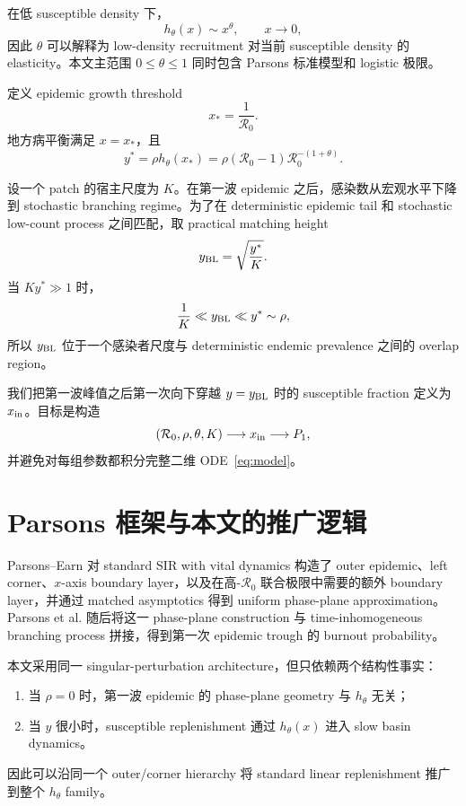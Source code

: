\documentclass[11pt,a4paper]{ctexart}
\newcommand{\Rzero}{\mathcal R_0}
\newcommand{\BL}{y_{\rm BL}}
\newcommand{\xin}{x_{\rm in}}
\newcommand{\xs}{x_*}
\newcommand{\Pone}{P_1}
\begin{document}
在低 susceptible density 下，
\[
h_\theta(x)\sim x^\theta,
\qquad x\to0,
\]
因此 $\theta$ 可以解释为 low-density recruitment 对当前 susceptible density 的 elasticity。本文主范围 $0\leq\theta\leq1$ 同时包含 Parsons 标准模型和 logistic 极限。

定义 epidemic growth threshold
\begin{equation}
\label{eq:xstar}
\xs=\frac1{\Rzero}.
\end{equation}
地方病平衡满足 $x=\xs$，且
\begin{equation}
\label{eq:ystar}
y^*=\rho h_\theta(\xs)
=\rho(\Rzero-1)\Rzero^{-(1+\theta)}.
\end{equation}

设一个 patch 的宿主尺度为 $K$。在第一波 epidemic 之后，感染数从宏观水平下降到 stochastic branching regime。为了在 deterministic epidemic tail 和 stochastic low-count process 之间匹配，取 practical matching height
\begin{equation}
\label{eq:ybl}
\BL=\sqrt{\frac{y^*}{K}}.
\end{equation}
当 $Ky^*\gg1$ 时，
\[
\frac1K\ll\BL\ll y^*\sim\rho,
\]
所以 $\BL$ 位于一个感染者尺度与 deterministic endemic prevalence 之间的 overlap region。

我们把第一波峰值之后第一次向下穿越 $y=\BL$ 时的 susceptible fraction 定义为 $\xin$。目标是构造
\[
(\Rzero,\rho,\theta,K)
\longrightarrow \xin
\longrightarrow \Pone,
\]
并避免对每组参数都积分完整二维 ODE~\eqref{eq:model}。

\section{Parsons 框架与本文的推广逻辑}
Parsons--Earn 对 standard SIR with vital dynamics 构造了 outer epidemic、left corner、$x$-axis boundary layer，以及在高-$\Rzero$ 联合极限中需要的额外 boundary layer，并通过 matched asymptotics 得到 uniform phase-plane approximation\cite{PE2024}。Parsons et al. 随后将这一 phase-plane construction 与 time-inhomogeneous branching process 拼接，得到第一次 epidemic trough 的 burnout probability\cite{PNAS2024}。

本文采用同一 singular-perturbation architecture，但只依赖两个结构性事实：
\begin{enumerate}[leftmargin=2.2em]
\item 当 $\rho=0$ 时，第一波 epidemic 的 phase-plane geometry 与 $h_\theta$ 无关；
\item 当 $y$ 很小时，susceptible replenishment 通过 $h_\theta(x)$ 进入 slow basin dynamics。
\end{enumerate}
因此可以沿同一个 outer/corner hierarchy 将 standard linear replenishment 推广到整个 $h_\theta$ family。
\end{document}
